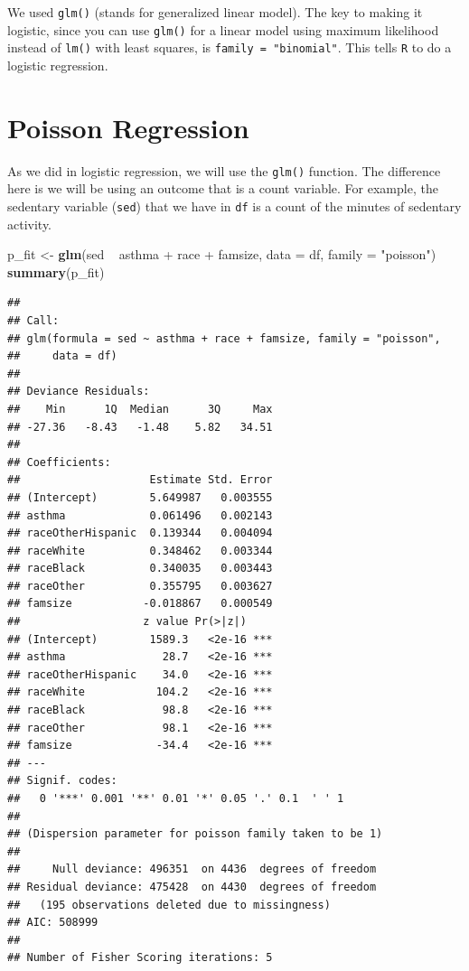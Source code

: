 \documentclass[]{tufte-book}
\newenvironment{Shaded}{}{}
\newcommand{\KeywordTok}[1]{\textcolor[rgb]{0.00,0.44,0.13}{\textbf{#1}}}
\newcommand{\DataTypeTok}[1]{\textcolor[rgb]{0.56,0.13,0.00}{#1}}
\newcommand{\StringTok}[1]{\textcolor[rgb]{0.25,0.44,0.63}{#1}}
\newcommand{\OperatorTok}[1]{\textcolor[rgb]{0.40,0.40,0.40}{#1}}
\newcommand{\NormalTok}[1]{#1}
\theoremstyle{definition}
\theoremstyle{definition}
\theoremstyle{remark}
\begin{document}
We used \texttt{glm()} (stands for generalized linear model). The key to
making it logistic, since you can use \texttt{glm()} for a linear model
using maximum likelihood instead of \texttt{lm()} with least squares, is
\texttt{family\ =\ "binomial"}. This tells \texttt{R} to do a logistic
regression.

\section*{Poisson Regression}\label{poisson-regression}

As we did in logistic regression, we will use the \texttt{glm()}
function. The difference here is we will be using an outcome that is a
count variable. For example, the sedentary variable (\texttt{sed}) that
we have in \texttt{df} is a count of the minutes of sedentary activity.

\begin{Shaded}
\begin{Highlighting}[]
\NormalTok{p_fit <-}\StringTok{ }\KeywordTok{glm}\NormalTok{(sed }\OperatorTok{~}\StringTok{ }\NormalTok{asthma }\OperatorTok{+}\StringTok{ }\NormalTok{race }\OperatorTok{+}\StringTok{ }\NormalTok{famsize, }\DataTypeTok{data =}\NormalTok{ df, }
    \DataTypeTok{family =} \StringTok{"poisson"}\NormalTok{)}
\KeywordTok{summary}\NormalTok{(p_fit)}
\end{Highlighting}
\end{Shaded}

\begin{verbatim}
## 
## Call:
## glm(formula = sed ~ asthma + race + famsize, family = "poisson", 
##     data = df)
## 
## Deviance Residuals: 
##    Min      1Q  Median      3Q     Max  
## -27.36   -8.43   -1.48    5.82   34.51  
## 
## Coefficients:
##                    Estimate Std. Error
## (Intercept)        5.649987   0.003555
## asthma             0.061496   0.002143
## raceOtherHispanic  0.139344   0.004094
## raceWhite          0.348462   0.003344
## raceBlack          0.340035   0.003443
## raceOther          0.355795   0.003627
## famsize           -0.018867   0.000549
##                   z value Pr(>|z|)    
## (Intercept)        1589.3   <2e-16 ***
## asthma               28.7   <2e-16 ***
## raceOtherHispanic    34.0   <2e-16 ***
## raceWhite           104.2   <2e-16 ***
## raceBlack            98.8   <2e-16 ***
## raceOther            98.1   <2e-16 ***
## famsize             -34.4   <2e-16 ***
## ---
## Signif. codes:  
##   0 '***' 0.001 '**' 0.01 '*' 0.05 '.' 0.1  ' ' 1
## 
## (Dispersion parameter for poisson family taken to be 1)
## 
##     Null deviance: 496351  on 4436  degrees of freedom
## Residual deviance: 475428  on 4430  degrees of freedom
##   (195 observations deleted due to missingness)
## AIC: 508999
## 
## Number of Fisher Scoring iterations: 5
\end{verbatim}
\end{document}

